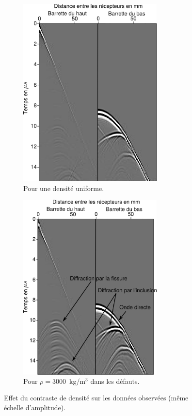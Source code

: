 \begin{figure}[!h]
	\centering
	\begin{subfigure}[b]{0.45\textwidth}
		\centering
		\includegraphics[width=0.8\textwidth]{img/rho_sur_donnees/data_rho_uni.png}
		\caption{Pour une densité uniforme.}
	\end{subfigure}
		\begin{subfigure}[b]{0.45\textwidth}
		\centering
		\includegraphics[width=0.8\textwidth]{img/rho_sur_donnees/data_rho_vrai.png}
		\caption{Pour $\rho=3000$~kg/m$^{3}$ dans les défauts.}
	\end{subfigure}
	\caption{Effet du contraste de densité sur les données observées (même échelle d'amplitude).\label{app:traces_rho}}	
\end{figure}
